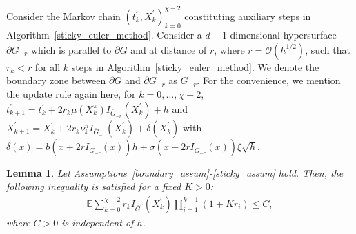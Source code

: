 \documentclass{article}
\newtheorem{lemma}[theorem]{Lemma}
\theoremstyle{definition}
\numberwithin{equation}{section}
\begin{document}
Consider the Markov chain $(t_{k}^{'}, X^{'}_{k})_{k=0}^{\chi -2}$ constituting auxiliary steps in Algorithm~\ref{sticky_euler_method}. Consider a $d-1$ dimensional hypersurface $\partial G_{-r}$ which is parallel to $\partial G$  and at  distance of $r$, where $r = \mathcal{O}(h^{1/2})$, such that $r_k < r$ for all $k$ steps in Algorithm~\ref{sticky_euler_method}. We denote the boundary zone between $\partial G$ and $\partial G_{-r}$ as $G_{-r}$.  For the convenience, we mention the update rule again here, for $k = 0, \dots, \chi-2 $,  $t_{k+1}^{'} = t_{k}^{'} + 2r_{k}\mu(X_{k}^{\pi})I_{\bar{G}_{-r}}(X_{k}^{'}) + h$ and $X_{k+1}^{'}  =  X_{k}^{'} + 2r_{k}\nu^{\pi}_{k} I_{\bar{G}_{-r}}(X_{k}^{'}) + \delta(X^{'}_{k})  $ with $\delta (x) =  b(x + 2 r I_{\bar{G}_{-r}}(x)) h + \sigma (x + 2 r I_{\bar{G}_{-r}}(x))\xi \sqrt{h}$.   
\begin{lemma}\label{sticky_lemma_avgreflection}
    Let Assumptions~\ref{boundary_assum}-\ref{sticky_assum} hold. Then, the following inequality is satisfied for a fixed $K>0$:
    \begin{align*}
       \mathbb{E}\sum_{k=0}^{\chi-2}r_{k}I_{\bar{G}^c}(X_{k}^{'}) \prod_{i=1}^{k-1}(1 + K r_{i}) \leq C, 
    \end{align*}
    where $C>0$ is independent of $h$.
\end{lemma}
\end{document}
